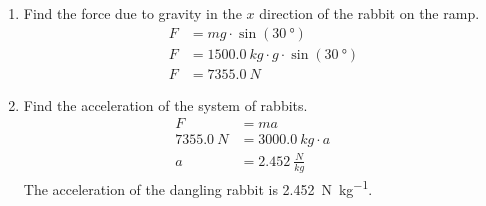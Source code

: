 \documentclass[letterpaper, 12pt]{report}
\begin{document}
\begin{enumerate}
\begin{enumerate}
            \item Find the force due to gravity in the $x$ direction of the rabbit on the ramp.
                \begin{align}
                    F &= mg \cdot \sin(\SI{30}{\degree}) \\
                    F &= \SI{1500.0}{kg} \cdot g \cdot \sin(\SI{30}{\degree}) \\
                    F &= \SI{7355.0}{N}
                \end{align}
                
            \item Find the acceleration of the system of rabbits.
                \begin{align}
                    F &= ma \\
                    \SI{7355.0}{N} &= \SI{3000.0}{kg} \cdot a && \text{} \\
                    a &= \SI{2.452}{\frac{N}{kg}}
                \end{align}
            The acceleration of the dangling rabbit is \SI{2.452}{\newton\per\kilogram}.
        \end{enumerate}
\end{enumerate}
\end{document}
